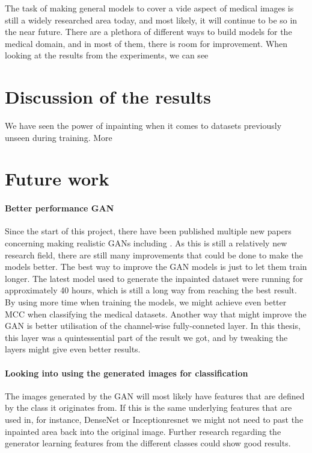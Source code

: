 The task of making general models to cover a vide aspect of medical images is still a widely researched area today, and most likely, it will continue to be so in the near future. There are a  plethora of different ways to build models for the medical domain, and in most of them, there is room for improvement.
When looking at the results from the experiments, we can see 

\section{Discussion of the results}
We have seen the power of inpainting when it comes to datasets previously unseen during training.
More
\section{Future work}

\paragraph{Better performance GAN}
Since the start of this project, there have been published multiple new papers concerning making realistic GANs including \cite{DBLP:journals/corr/abs-1809-11096} \cite{DBLP:journals/corr/abs-1812-04948}. As this is still a relatively new research field, there are still many improvements that could be done to make the models better.
The best way to improve the GAN models is just to let them train longer. The latest model used to generate the inpainted dataset were running for approximately 40 hours, which is still a long way from reaching the best result. By using more time when training the models, we might achieve even better MCC when classifying the medical datasets.
Another way that might improve the GAN is better utilisation of the channel-wise fully-conneted layer. In this thesis, this layer was a quintessential part of the result we got, and by tweaking the layers might give even better results.


\paragraph{Looking into using the generated images for classification}
The images generated by the GAN will most likely have features that are defined by the class it originates from. If this is the same underlying features that are used in, for instance, DenseNet or Inceptionresnet we might not need to past the inpainted area back into the original image.
Further research regarding the generator learning features from the different classes could show good results.

